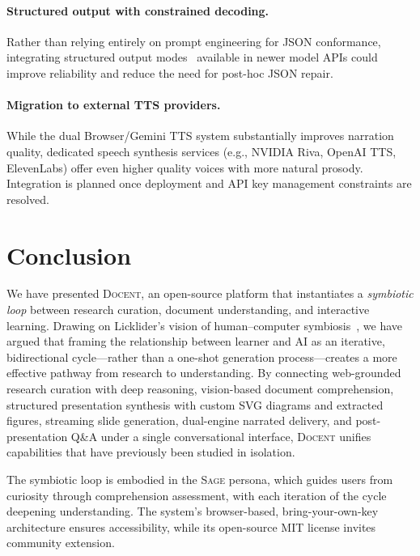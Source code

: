 \documentclass[11pt,a4paper]{article}
\newcommand{\system}{\textsc{Docent}\xspace}
\newcommand{\sage}{\textsc{Sage}\xspace}
\begin{document}
\paragraph{Structured output with constrained decoding.}
Rather than relying entirely on prompt engineering for JSON conformance, integrating structured output modes~\citep{willard2023guided} available in newer model APIs could improve reliability and reduce the need for post-hoc JSON repair.

\paragraph{Migration to external TTS providers.}
While the dual Browser/Gemini TTS system substantially improves narration quality, dedicated speech synthesis services (e.g., NVIDIA Riva, OpenAI TTS, ElevenLabs) offer even higher quality voices with more natural prosody. Integration is planned once deployment and API key management constraints are resolved.


\section{Conclusion}
\label{sec:conclusion}

We have presented \system, an open-source platform that instantiates a \emph{symbiotic loop} between research curation, document understanding, and interactive learning.
Drawing on Licklider's vision of human--computer symbiosis~\citep{licklider1960symbiosis}, we have argued that framing the relationship between learner and AI as an iterative, bidirectional cycle---rather than a one-shot generation process---creates a more effective pathway from research to understanding.
By connecting web-grounded research curation with deep reasoning, vision-based document comprehension, structured presentation synthesis with custom SVG diagrams and extracted figures, streaming slide generation, dual-engine narrated delivery, and post-presentation Q\&A under a single conversational interface, \system unifies capabilities that have previously been studied in isolation.

The symbiotic loop is embodied in the \sage persona, which guides users from curiosity through comprehension assessment, with each iteration of the cycle deepening understanding.
The system's browser-based, bring-your-own-key architecture ensures accessibility, while its open-source MIT license invites community extension.
\end{document}
